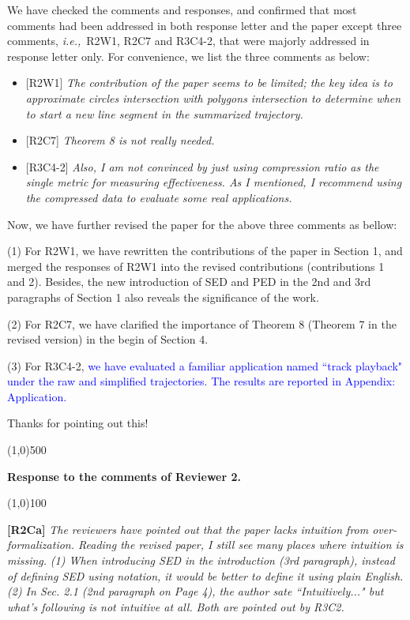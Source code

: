 \documentclass{letter}
\newcommand{\ie}{\emph{i.e.,}\xspace}
\begin{document}
We have checked the comments and responses, and confirmed that most comments had been addressed in both response letter and the paper except three comments, \ie~{R2W1}, {R2C7} and {R3C4-2}, that were majorly addressed in response letter only. For convenience, we list the three comments as below:
\begin{itemize}
  \item {{[R2W1]} \emph{The contribution of the paper seems to be limited; the key idea is to approximate circles intersection with polygons intersection to determine when to start a new line segment in the summarized trajectory.}}
  \item {{[R2C7]} \emph{Theorem 8 is not really needed.}}
  \item {{[R3C4-2]} \emph{Also, I am not convinced by just using compression ratio as the single metric for measuring effectiveness. As I mentioned, I recommend using the compressed data to evaluate some real applications.}
}
\end{itemize}

Now, we have further revised the paper for the above three comments as bellow:

(1) For {R2W1}, we have rewritten the contributions of the paper in Section 1, and merged the responses of {R2W1} into the revised contributions (contributions 1 and 2). Besides, the new introduction of SED and PED in the 2nd and 3rd paragraphs of Section 1 also reveals the significance of the work.

(2) For {R2C7}, we have clarified the importance of Theorem 8 (Theorem 7 in the revised version) in the begin of Section 4.

(3) For {R3C4-2}, \textcolor{blue}{we have evaluated a familiar application named ``track playback" under the raw and simplified trajectories. The results are reported in Appendix: Application.}

Thanks for pointing out this!





\line(1,0){500}

\textbf{Response to the comments of Reviewer 2.}

\line(1,0){100}


\textbf{[R2Ca]} \emph{The reviewers have pointed out that the paper lacks intuition from over-formalization. Reading the revised paper, I still see many places where intuition is missing.}
\emph{(1) When introducing SED in the introduction (3rd paragraph), instead of defining SED using notation, it would be better to define it using plain English.}
\emph{(2) In Sec. 2.1 (2nd paragraph on Page 4), the author sate ``Intuitively..." but what's following is not intuitive at all.}
\emph{Both are pointed out by {R3C2}.}
\end{document}
